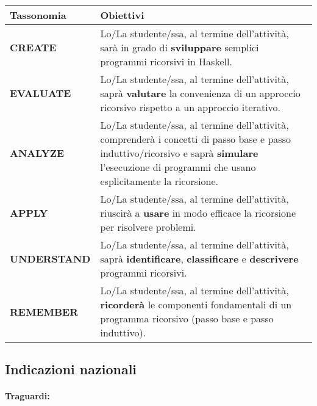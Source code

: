 \begin{center}
    \begin{tabular}{ || C{3cm} | >{}p{8.3cm} ||}
    \hline\hline
    \textbf{Tassonomia} & \textbf{Obiettivi}\\ \hline
        \textbf{CREATE} & Lo/La studente/ssa, al termine dell'attività, 
        sarà in grado di \textbf{sviluppare} semplici programmi ricorsivi in Haskell. \\\hline

        \textbf{EVALUATE} & Lo/La studente/ssa, al termine dell'attività,
        saprà \textbf{valutare} la convenienza di un approccio ricorsivo rispetto a un 
        approccio iterativo.\\\hline

        \textbf{ANALYZE} &  Lo/La studente/ssa, al termine dell'attività,
        comprenderà i concetti di passo base e passo induttivo/ricorsivo e 
        saprà \textbf{simulare} l'esecuzione di programmi che usano esplicitamente
        la ricorsione.\\\hline

        \textbf{APPLY} & Lo/La studente/ssa, al termine dell'attività,
        riuscirà a \textbf{usare} in modo efficace la ricorsione per risolvere
        problemi. \\\hline

        \textbf{UNDERSTAND} &  Lo/La studente/ssa, al termine dell'attività,
        saprà \textbf{identificare}, \textbf{classificare} e \textbf{descrivere} programmi ricorsivi. \\\hline

        \textbf{REMEMBER} &  Lo/La studente/ssa, al termine dell'attività,
        \textbf{ricorderà} le componenti fondamentali di un programma ricorsivo 
        (passo base e passo induttivo).\\\hline

    \hline
    \end{tabular}
\end{center}


\subsection{Indicazioni nazionali}

\paragraph{Traguardi:}


